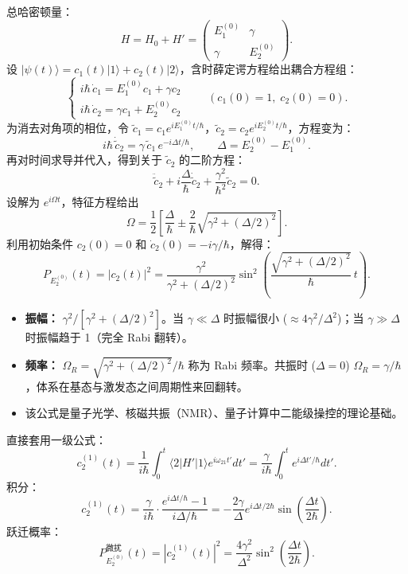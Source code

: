 \begin{derivationbox}
总哈密顿量：
\[
H = H_0 + H' = \begin{pmatrix} E_1^{(0)} & \gamma \\ \gamma & E_2^{(0)} \end{pmatrix}.
\]
设 $|\psi(t)\rangle = c_1(t)|1\rangle + c_2(t)|2\rangle$，含时薛定谔方程给出耦合方程组：
\[
\begin{cases}
i\hbar \, \dot{c}_1 = E_1^{(0)} c_1 + \gamma c_2 \\[4pt]
i\hbar \, \dot{c}_2 = \gamma c_1 + E_2^{(0)} c_2
\end{cases}
\qquad (c_1(0)=1,\; c_2(0)=0).
\]
为消去对角项的相位，令 $\tilde{c}_1 = c_1 e^{iE_1^{(0)}t/\hbar}$，$\tilde{c}_2 = c_2 e^{iE_2^{(0)}t/\hbar}$，方程变为：
\[
i\hbar \, \dot{\tilde{c}}_2 = \gamma \, \tilde{c}_1 \, e^{-i\Delta t/\hbar}, \qquad \Delta = E_2^{(0)} - E_1^{(0)}.
\]
再对时间求导并代入，得到关于 $\tilde{c}_2$ 的二阶方程：
\[
\ddot{\tilde{c}}_2 + i\frac{\Delta}{\hbar} \dot{\tilde{c}}_2 + \frac{\gamma^2}{\hbar^2} \tilde{c}_2 = 0.
\]
设解为 $e^{i\Omega t}$，特征方程给出
\[
\Omega = \frac{1}{2} \left[ \frac{\Delta}{\hbar} \pm \frac{2}{\hbar} \sqrt{\gamma^2 + (\Delta/2)^2} \right].
\]
利用初始条件 $c_2(0)=0$ 和 $\dot{c}_2(0) = -i\gamma/\hbar$，解得：
\[
P_{E_2^{(0)}}(t) = |c_2(t)|^2 = \frac{\gamma^2}{\gamma^2 + (\Delta/2)^2} \sin^2\!\left( \frac{\sqrt{\gamma^2 + (\Delta/2)^2}}{\hbar}\, t \right).
\]
\end{derivationbox}

\begin{insightbox}
\begin{itemize}
\item \textbf{振幅：} $\gamma^2/[\gamma^2 + (\Delta/2)^2]$。当 $\gamma \ll \Delta$ 时振幅很小 ($\approx 4\gamma^2/\Delta^2$)；当 $\gamma \gg \Delta$ 时振幅趋于 1（完全 Rabi 翻转）。
\item \textbf{频率：} $\Omega_R = \sqrt{\gamma^2 + (\Delta/2)^2}/\hbar$ 称为 Rabi 频率。共振时 ($\Delta=0$) $\Omega_R = \gamma/\hbar$，体系在基态与激发态之间周期性来回翻转。
\item 该公式是量子光学、核磁共振（NMR）、量子计算中二能级操控的理论基础。
\end{itemize}
\end{insightbox}

\begin{derivationbox}[一阶含时微扰理论]
直接套用一级公式：
\[
c_2^{(1)}(t) = \frac{1}{i\hbar} \int_0^t \langle 2|H'|1\rangle e^{i\omega_{21}t'} dt' = \frac{\gamma}{i\hbar} \int_0^t e^{i\Delta t'/\hbar} dt'.
\]
积分：
\[
c_2^{(1)}(t) = \frac{\gamma}{i\hbar} \cdot \frac{e^{i\Delta t/\hbar} - 1}{i\Delta/\hbar} = -\frac{2\gamma}{\Delta} e^{i\Delta t/2\hbar} \sin\!\left( \frac{\Delta t}{2\hbar} \right).
\]
跃迁概率：
\[
P_{E_2^{(0)}}^{\text{微扰}}(t) = |c_2^{(1)}(t)|^2 = \frac{4\gamma^2}{\Delta^2} \sin^2\!\left( \frac{\Delta t}{2\hbar} \right).
\]
\end{derivationbox}

